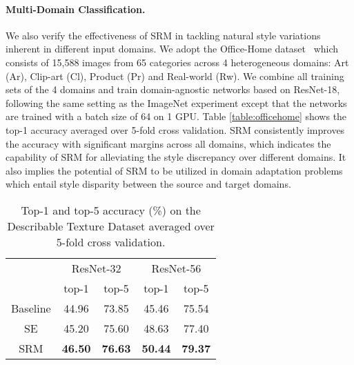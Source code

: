 \paragraph{Multi-Domain Classification.}
We also verify the effectiveness of SRM in tackling natural style variations inherent in different input domains.
We adopt the Office-Home dataset~\cite{venkateswara2017deep} which consists of 15,588 images from 65 categories across 4 heterogeneous domains: Art (Ar), Clip-art (Cl), Product (Pr) and Real-world (Rw).
We combine all training sets of the 4 domains and train domain-agnostic networks based on ResNet-18, following the same setting as the ImageNet experiment except that the networks are trained with a batch size of 64 on 1 GPU.
Table \ref{table:officehome} shows the top-1 accuracy averaged over 5-fold cross validation.
SRM consistently improves the accuracy with significant margins across all domains, which indicates the capability of SRM for alleviating the style discrepancy over different domains.
It also implies the potential of SRM to be utilized in domain adaptation problems~\cite{tzeng2017adversarial,hoffman2018cycada} which entail style disparity between the source and target domains.

\begin{table}
\caption{Top-1 and top-5 accuracy (\%) on the Describable Texture Dataset averaged over 5-fold cross validation. }
\vspace{-1em}
\begin{center}
\begin{tabular}{c|c|c|c|c}
\hline
 & \multicolumn{2}{|c|}{ResNet-32} & \multicolumn{2}{|c}{ResNet-56} \\ \cline{2-5}
 & top-1 & top-5 & top-1 & top-5 \\
\hline
Baseline & 44.96 & 73.85 & 45.46 & 75.54  \\
SE & 45.20 & 75.60 & 48.63 & 77.40  \\
SRM & \textbf{46.50} & \textbf{76.63} & \textbf{50.44} & \textbf{79.37}  \\
\hline
\end{tabular}
\end{center}
\label{table:dtd}
\end{table}

